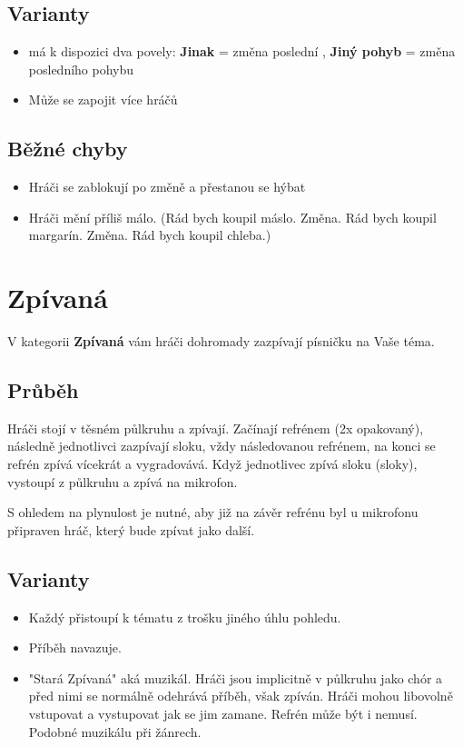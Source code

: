 \subsection{ Varianty } \begin{itemize}
\item  {} má k dispozici dva povely: \textbf{Jinak}{} = změna poslední , \textbf{Jiný pohyb}{} = změna posledního pohybu
\item  Může se zapojit více hráčů
\end{itemize}
 
\subsection{ Běžné chyby } \begin{itemize}
\item Hráči se zablokují po změně a přestanou se hýbat
\item Hráči mění příliš málo.  (Rád bych koupil máslo. Změna. Rád bych koupil margarín. Změna. Rád bych koupil chleba.)
\end{itemize}
 
 
 
 
 
\needspace{5cm} \section{Zpívaná} \label{zpívaná}  
 
 
V kategorii \textbf{Zpívaná}{} vám hráči dohromady zazpívají písničku na Vaše téma. 
 
 
\subsection{Průběh} Hráči stojí v těsném půlkruhu a zpívají. Začínají refrénem (2x opakovaný), následně jednotlivci zazpívají sloku, vždy následovanou refrénem, na konci se refrén zpívá vícekrát a vygradovává. Když jednotlivec zpívá sloku (sloky), vystoupí z půlkruhu a zpívá na mikrofon.  
 
S ohledem na plynulost je nutné, aby již na závěr refrénu byl u mikrofonu připraven hráč, který bude zpívat jako další. 
 
 
\subsection{ Varianty } \begin{itemize}
\item  Každý přistoupí k tématu z trošku jiného úhlu pohledu.
\item  Příběh navazuje.
\item  "Stará Zpívaná"{} aká muzikál. Hráči jsou implicitně v půlkruhu jako chór a před nimi se normálně odehrává příběh, však zpíván. Hráči mohou libovolně vstupovat a vystupovat jak se jim zamane. Refrén může být i nemusí. Podobné muzikálu při žánrech.
\end{itemize}
 
